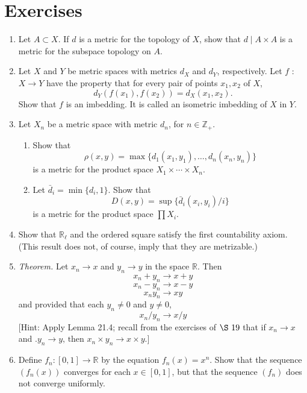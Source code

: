 \section*{Exercises}
\begin{enumerate}[itemsep=0.4em, parsep=0pt, topsep=0pt, partopsep=0pt, leftmargin=*, label=\arabic*., ref=\arabic*]
\item Let \(A \subset X\). If \(d\) is a metric for the topology of \(X\), show that \(d \mid A \times A\) is a metric for the subspace topology on \(A\).
\item Let \(X\) and \(Y\) be metric spaces with metrics \(d_{X}\) and \(d_{Y}\), respectively. Let \(f\) : \(X \rightarrow Y\) have the property that for every pair of points \(x_{1},x_{2}\) of \(X\), \[ d_{Y}( {f( x_{1}),f( x_{2}) }) = d_{X}( {x_{1},x_{2}}). \] Show that \(f\) is an imbedding. It is called an isometric imbedding of \(X\) in \(Y\).
\item Let \(X_{n}\) be a metric space with metric \(d_{n}\), for \(n \in {\mathbb{Z}}_{ + }\).
  \begin{enumerate}[itemsep=0.2em, parsep=0pt, topsep=0pt, partopsep=0pt, leftmargin=*, label=(\alph*), align=left]
  \item Show that \[ \rho ( {x,y}) = \max \{ {d_{1}( {x_{1},y_{1}}),\ldots,d_{n}( {x_{n},y_{n}}) }\} \] is a metric for the product space \(X_{1} \times \cdots \times {X}_{n}\).
  \item Let \(\bar{d}_{i} = \min \{ {d_{i},1}\}\). Show that \[ D( {x,y}) = \sup \{ {\bar{d}_{i}( {x_{i},y_{i}}) /i}\} \] is a metric for the product space \(\prod {X}_{i}\).
  \end{enumerate}
\item Show that \(\mathbb{R}_{\ell }\) and the ordered square satisfy the first countability axiom. (This result does not, of course, imply that they are metrizable.)
\item \textsl{Theorem.} Let \(x_{n} \rightarrow x\) and \(y_{n} \rightarrow y\) in the space \(\mathbb{R}\). Then \[ x_{n} + y_{n} \rightarrow x + y \] \[ x_{n} - y_{n} \rightarrow x - y \] \[ x_{n}y_{n} \rightarrow {xy} \] and provided that each \(y_{n} \neq 0\) and \(y \neq 0\), \[ x_{n}/y_{n} \rightarrow x/y \] [Hint: Apply Lemma 21.4; recall from the exercises of \(\S\ {19}\) that if \(x_{n} \rightarrow x\) and \(. {y_{n} \rightarrow y\text{, then }x_{n} \times {y}_{n} \rightarrow x \times y\text{.}}]\)
\item Define \(f_{n} :[ {0,1}] \rightarrow \mathbb{R}\) by the equation \(f_{n}(x) = x^{n}\). Show that the sequence \(( {f_{n}(x) })\) converges for each \(x \in [ {0,1}]\), but that the sequence \(( f_{n})\) does not converge uniformly.

\end{enumerate}
